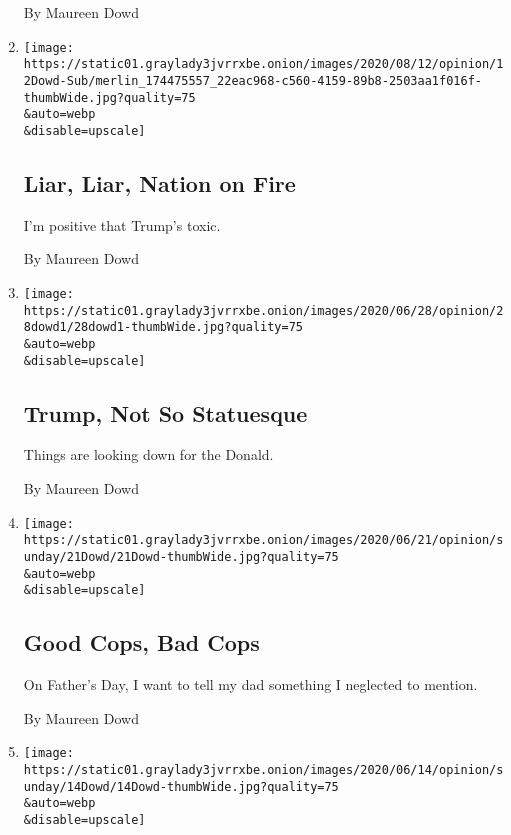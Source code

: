 \begin{enumerate}
  By Maureen Dowd
\item
  \href{/2020/07/11/opinion/sunday/trump-biden-2020.html}{}

  \texttt{[image: https://static01.graylady3jvrrxbe.onion/images/2020/08/12/opinion/12Dowd-Sub/merlin\_174475557\_22eac968-c560-4159-89b8-2503aa1f016f-thumbWide.jpg?quality=75\\\&auto=webp\\\&disable=upscale]}

  \hypertarget{liar-liar-nation-on-fire}{%
  \subsection{Liar, Liar, Nation on
  Fire}\label{liar-liar-nation-on-fire}}

  I'm positive that Trump's toxic.

  By Maureen Dowd
\item
  \href{/2020/06/27/opinion/sunday/trump-statues-2020-reelection.html}{}

  \texttt{[image: https://static01.graylady3jvrrxbe.onion/images/2020/06/28/opinion/28dowd1/28dowd1-thumbWide.jpg?quality=75\\\&auto=webp\\\&disable=upscale]}

  \hypertarget{trump-not-so-statuesque}{%
  \subsection{Trump, Not So Statuesque}\label{trump-not-so-statuesque}}

  Things are looking down for the Donald.

  By Maureen Dowd
\item
  \href{/2020/06/20/opinion/sunday/police-good-cops-fathers-day.html}{}

  \texttt{[image: https://static01.graylady3jvrrxbe.onion/images/2020/06/21/opinion/sunday/21Dowd/21Dowd-thumbWide.jpg?quality=75\\\&auto=webp\\\&disable=upscale]}

  \hypertarget{good-cops-bad-cops}{%
  \subsection{Good Cops, Bad Cops}\label{good-cops-bad-cops}}

  On Father's Day, I want to tell my dad something I neglected to
  mention.

  By Maureen Dowd
\item
  \href{/2020/06/13/opinion/sunday/gregg-popovich-trump-nba-protests.html}{}

  \texttt{[image: https://static01.graylady3jvrrxbe.onion/images/2020/06/14/opinion/sunday/14Dowd/14Dowd-thumbWide.jpg?quality=75\\\&auto=webp\\\&disable=upscale]}


\end{enumerate}
